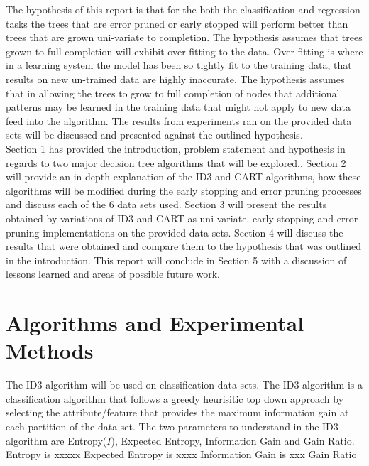 \documentclass[twoside,11pt]{article}
\begin{document}
\hspace*{5mm} The hypothesis of this report is that for the both the classification and regression tasks the trees that are error pruned or early stopped will perform better than trees that are grown uni-variate to completion. The hypothesis assumes that trees grown to full completion will exhibit over fitting to the data. Over-fitting is where in a learning system the model has been so tightly fit to the training data, that results on new un-trained data are highly inaccurate. The hypothesis assumes that in allowing the trees to grow to full completion of nodes that additional patterns may be learned in the training data that might not apply to new data feed into the algorithm. The results from experiments ran on the provided data sets will be discussed and presented against the outlined hypothesis.\\

\hspace*{5mm} Section 1 has provided the introduction, problem statement and hypothesis in regards to two major decision tree algorithms that will be explored.. Section 2 will provide an in-depth explanation of the ID3 and CART algorithms, how these algorithms will be modified during the early stopping and error pruning processes and discuss each of the 6 data sets used. Section 3 will present the results obtained by variations of ID3 and CART as uni-variate, early stopping and error pruning implementations on the provided data sets. Section 4 will discuss the results that were obtained and compare them to the hypothesis that was outlined in the introduction. This report will conclude in Section 5 with a discussion of lessons learned and areas of possible future work.\\


\section{Algorithms and Experimental Methods}
\hspace*{10mm} The ID3 algorithm will be used on classification data sets. The ID3 algorithm is a classification algorithm that follows a greedy heurisitic top down approach by selecting the attribute/feature that provides the maximum information gain at each partition of the data set. The two parameters to understand in the ID3 algorithm are Entropy($I$), Expected Entropy, Information Gain and Gain Ratio.\newline
Entropy is xxxxx\newline
Expected Entropy is xxxx\newline
Information Gain is xxx\newline
Gain Ratio \newline
\newpage
\end{document}

